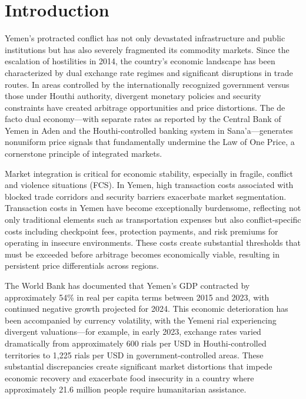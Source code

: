 \section{Introduction}

Yemen's protracted conflict has not only devastated infrastructure and public institutions but has also severely fragmented its commodity markets. Since the escalation of hostilities in 2014, the country's economic landscape has been characterized by dual exchange rate regimes and significant disruptions in trade routes. In areas controlled by the internationally recognized government versus those under Houthi authority, divergent monetary policies and security constraints have created arbitrage opportunities and price distortions. The de facto dual economy—with separate rates as reported by the Central Bank of Yemen in Aden and the Houthi-controlled banking system in Sana'a—generates nonuniform price signals that fundamentally undermine the Law of One Price, a cornerstone principle of integrated markets.

Market integration is critical for economic stability, especially in fragile, conflict and violence situations (FCS). In Yemen, high transaction costs associated with blocked trade corridors and security barriers exacerbate market segmentation. Transaction costs in Yemen have become exceptionally burdensome, reflecting not only traditional elements such as transportation expenses but also conflict-specific costs including checkpoint fees, protection payments, and risk premiums for operating in insecure environments. These costs create substantial thresholds that must be exceeded before arbitrage becomes economically viable, resulting in persistent price differentials across regions.

The World Bank has documented that Yemen's GDP contracted by approximately 54\% in real per capita terms between 2015 and 2023, with continued negative growth projected for 2024.\autocite{worldbank2022} This economic deterioration has been accompanied by currency volatility, with the Yemeni rial experiencing divergent valuations—for example, in early 2023, exchange rates varied dramatically from approximately 600 rials per USD in Houthi-controlled territories to 1,225 rials per USD in government-controlled areas.\autocite{sanaa2023} These substantial discrepancies create significant market distortions that impede economic recovery and exacerbate food insecurity in a country where approximately 21.6 million people require humanitarian assistance.

